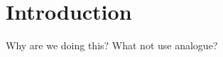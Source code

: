 \chapter{Introduction}
\label{chap:Introduction}

\note
{
	Why are we doing this? What not use analogue?
}

